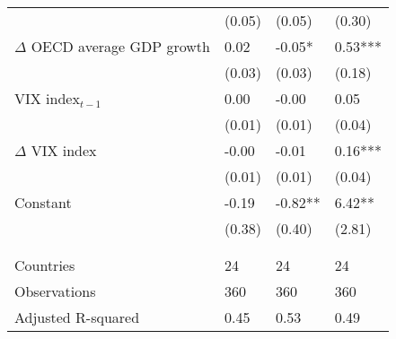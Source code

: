 {\begin{tabular}{lp{2cm}p{2cm}p{2cm}}
   & (0.05) & (0.05) & (0.30) \\ 
  $\Delta$ OECD average GDP growth & 0.02 & -0.05* & 0.53*** \\ 
   & (0.03) & (0.03) & (0.18) \\ 
  VIX index$_{t-1}$ & 0.00 & -0.00 & 0.05 \\ 
   & (0.01) & (0.01) & (0.04) \\ 
  $\Delta$ VIX index & -0.00 & -0.01 & 0.16*** \\ 
   & (0.01) & (0.01) & (0.04) \\ 
  Constant & -0.19 & -0.82** & 6.42** \\ 
   & (0.38) & (0.40) & (2.81) \\ 
   &  &  &  \\ 
   &  &  &  \\ 
  Countries & 24 & 24 & 24 \\ 
  Observations & 360 & 360 & 360 \\ 
  Adjusted R-squared & 0.45 & 0.53 & 0.49 \\ 
   \hline
\end{tabular}
}
